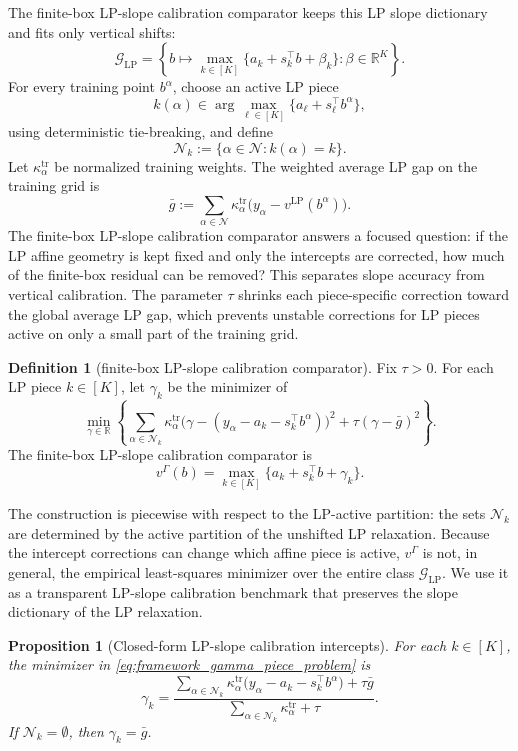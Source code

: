 \documentclass[11pt,letterpaper]{article}
\newtheorem{proposition}[theorem]{Proposition}
\theoremstyle{definition}
\newtheorem{definition}[theorem]{Definition}
\theoremstyle{remark}
\newcommand{\LP}{\mathrm{LP}}
\begin{document}
The finite-box LP-slope calibration comparator keeps this LP slope dictionary and fits
only vertical shifts:
$$
\mathcal G_{\LP}
=
\left\{
b\mapsto
\max_{k\in[K]}\{a_k+s_k^\top b+\beta_k\}:
\beta\in\mathbb R^K
\right\}.
$$
For every training point $b^\alpha$, choose an active LP piece
$$
k(\alpha)
\in
\arg\max_{\ell\in[K]}
\{a_\ell+s_\ell^\top b^\alpha\},
$$
using deterministic tie-breaking, and define
$$
\mathcal N_k:=\{\alpha\in\mathcal N:k(\alpha)=k\}.
$$
Let $\kappa_\alpha^{\mathrm{tr}}$ be normalized training weights. The weighted average
LP gap on the training grid is
$$
\bar g
:=
\sum_{\alpha\in\mathcal N}
\kappa_\alpha^{\mathrm{tr}}
\bigl(y_\alpha-v^{\LP}(b^\alpha)\bigr).
$$
The finite-box LP-slope calibration comparator answers a focused question: if the LP
affine geometry is kept fixed and only the intercepts are corrected, how much
of the finite-box residual can be removed? This separates slope accuracy from
vertical calibration. The parameter $\tau$ shrinks each piece-specific correction toward the global
average LP gap, which prevents unstable corrections for LP pieces active on
only a small part of the training grid.
\begin{definition}[finite-box LP-slope calibration comparator]
\label{def:framework_gamma_empirical}
Fix $\tau>0$. For each LP piece $k\in[K]$, let $\gamma_k$ be the minimizer of
\begin{equation}
\label{eq:framework_gamma_piece_problem}
\min_{\gamma\in\mathbb R}
\left\{
\sum_{\alpha\in\mathcal N_k}
\kappa_\alpha^{\mathrm{tr}}
\bigl(\gamma-(y_\alpha-a_k-s_k^\top b^\alpha)\bigr)^2
+
\tau(\gamma-\bar g)^2
\right\}.
\end{equation}
The finite-box LP-slope calibration comparator is
\begin{equation}
\label{eq:framework_gamma_empirical_formula_new}
v^\Gamma(b)
=
\max_{k\in[K]}
\{a_k+s_k^\top b+\gamma_k\}.
\end{equation}
\end{definition}
The construction is piecewise with respect to the LP-active partition: the sets $\mathcal N_k$ are determined by
the active partition of the unshifted LP relaxation. Because the intercept
corrections can change which affine piece is active, $v^\Gamma$ is not, in
general, the empirical least-squares minimizer over the entire class
$\mathcal G_{\LP}$. We use it as a transparent LP-slope calibration benchmark
that preserves the slope dictionary of the LP relaxation.
\begin{proposition}[Closed-form LP-slope calibration intercepts]
\label{prop:framework_gamma_optimizer}
For each $k\in[K]$, the minimizer in
\eqref{eq:framework_gamma_piece_problem} is
\begin{equation}
\label{eq:framework_eslp_intercepts_new}
\gamma_k
=
\frac{
\sum_{\alpha\in\mathcal N_k}
\kappa_\alpha^{\mathrm{tr}}
\bigl(y_\alpha-a_k-s_k^\top b^\alpha\bigr)
+
\tau\bar g
}{
\sum_{\alpha\in\mathcal N_k}\kappa_\alpha^{\mathrm{tr}}+\tau
}.
\end{equation}
If $\mathcal N_k=\emptyset$, then $\gamma_k=\bar g$.
\end{proposition}
\end{document}

